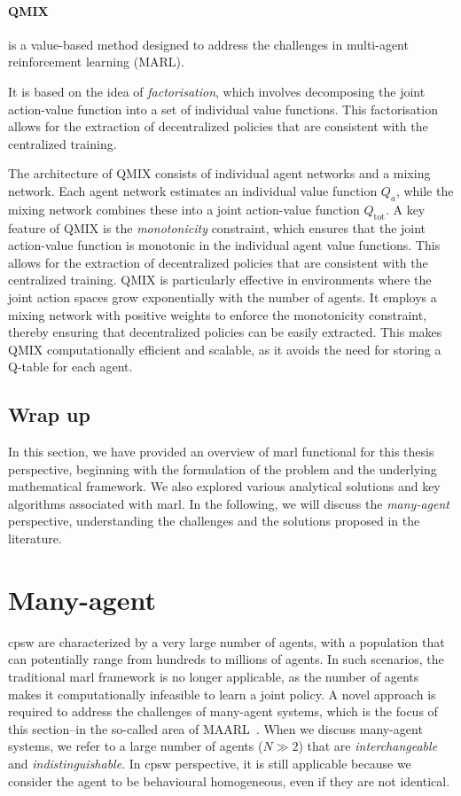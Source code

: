 \paragraph*{QMIX~\cite{QMIX}}
 is a value-based method designed to address the challenges in multi-agent reinforcement learning (MARL). 

It is based on the idea of \emph{factorisation}, 
 which involves decomposing the joint action-value function into a set of individual value functions. 
 This factorisation allows for the extraction of decentralized policies that are consistent with the centralized training.

The architecture of QMIX consists of individual agent networks and a mixing network. 
 Each agent network estimates an individual value function \( Q_a \), while the mixing network combines these into a joint action-value function \( Q_{\text{tot}} \). 
 A key feature of QMIX is the \emph{monotonicity} constraint, 
 which ensures that the joint action-value function is monotonic in the individual agent value functions. 
 This allows for the extraction of decentralized policies that are consistent with the centralized training.
%
QMIX is particularly effective in environments 
 where the joint action spaces grow exponentially with the number of agents. 
 It employs a mixing network with positive weights to enforce the monotonicity constraint, 
 thereby ensuring that decentralized policies can be easily extracted. 
 This makes QMIX computationally efficient and scalable, as it avoids the need for storing a Q-table for each agent.

\subsection{Wrap up}
In this section, we have provided an overview of \ac{marl} functional for this thesis perspective,
 beginning with the formulation of the problem and the underlying mathematical framework. 
 We also explored various analytical solutions and key algorithms associated with \ac{marl}.
In the following, we will discuss the \emph{many-agent} perspective, 
understanding the challenges and the solutions proposed in the literature.

\section{Many-agent}
\ac{cpsw} are characterized by a very large number of agents, 
 with a population that can potentially range from hundreds to millions of agents.
%
In such scenarios, 
 the traditional \ac{marl} framework is no longer applicable, 
 as the number of agents makes it computationally infeasible to learn a joint policy.
%
A novel approach is required to address the challenges of many-agent systems, 
 which is the focus of this section--in the so-called area of \ac{MAARL}~\cite{yang2021many}.
%
When we discuss many-agent systems, 
 we refer to a large number of agents ($N \gg 2$) 
 that are \emph{interchangeable} and \emph{indistinguishable}.
%
In \ac{cpsw} perspective, 
 it is still applicable because we consider the agent to be behavioural homogeneous, 
 even if they are not identical.

